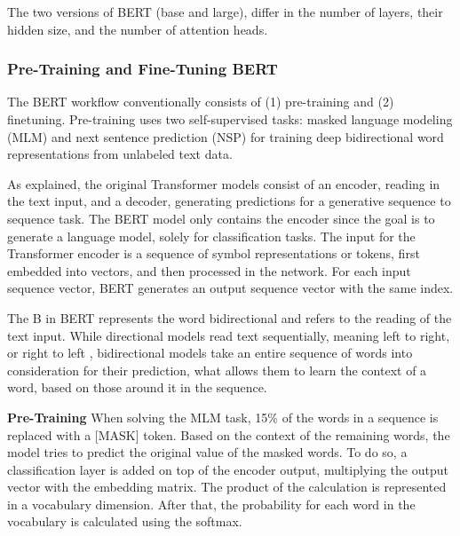 The two versions of BERT (base and large), differ in the number of layers, their hidden size, and the number of attention heads.  

\subsubsection{Pre-Training and Fine-Tuning BERT}
    \label{sec:bert_pre-fine}
The BERT workflow conventionally consists of (1) pre-training and (2) finetuning. Pre-training uses two self-supervised tasks: masked language modeling (MLM) and next sentence prediction (NSP) for training deep bidirectional word representations from unlabeled text data.

As explained, the original Transformer models consist of an encoder, reading in the text input, and a decoder, generating predictions for a generative sequence to sequence task. The BERT model only contains the encoder since the goal is to generate a language model, solely for classification tasks.
The input for the Transformer encoder is a sequence of symbol representations or tokens, first embedded into vectors, and then processed in the network. For each input sequence vector, BERT generates an output sequence vector with the same index.

The B in BERT represents the word bidirectional and refers to the reading of the text input. While directional models read text sequentially, meaning left to right, or right to left \cite{peters2018deep, radford2018improving}, bidirectional models take an entire sequence of words into consideration for their prediction, what allows them to learn the context of a word, based on those around it in the sequence.

\textbf{Pre-Training}
When solving the MLM task, 15\% of the words in a sequence is replaced with a [MASK] token. Based on the context of the remaining words, the model tries to predict the original value of the masked words. To do so, a classification layer is added on top of the encoder output, multiplying the output vector with the embedding matrix. The product of the calculation is represented in a vocabulary dimension. After that, the probability for each word in the vocabulary is calculated using the softmax.

